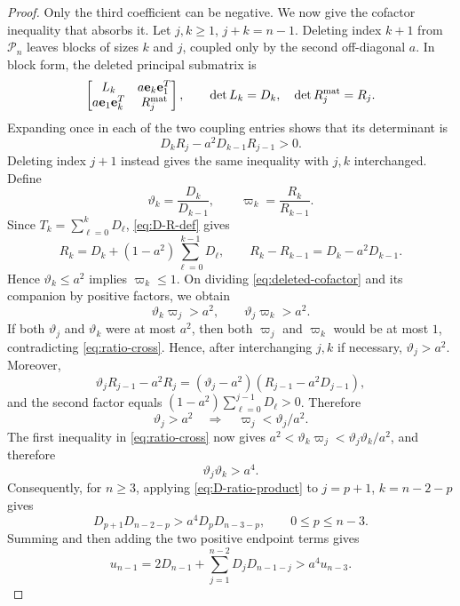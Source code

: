 \documentclass[review,hidelinks,onefignum,onetabnum]{siamart251216}
\begin{document}
\begin{proof}
Only the third coefficient can be negative.  We now give the cofactor
inequality that absorbs it.  Let \(j,k\geq1\), \(j+k=n-1\).  Deleting
index \(k+1\) from \(\mathcal P_n\) leaves blocks of sizes \(k\) and \(j\),
coupled only by the second off-diagonal \(a\).  In block form, the
deleted principal submatrix is
\[
 \begin{bmatrix}
  L_k&a \mathbf e_k\mathbf e_1^T\\
  a \mathbf e_1\mathbf e_k^T&R_j^{\rm mat}
 \end{bmatrix},
 \qquad \det L_k=D_k,\quad \det R_j^{\rm mat}=R_j.
\]
Expanding once in each of the two coupling entries shows that its
determinant is
\begin{equation}\label{eq:deleted-cofactor}
 D_kR_j-a^2D_{k-1}R_{j-1}>0.
\end{equation}
Deleting index \(j+1\) instead gives the same inequality with \(j,k\)
interchanged.  Define
\[
 \vartheta_k=\frac{D_k}{D_{k-1}},\qquad
 \varpi_k=\frac{R_k}{R_{k-1}}.
\]
Since \(T_k=\sum_{\ell=0}^kD_\ell\), \eqref{eq:D-R-def} gives
\begin{equation}\label{eq:R-D-relation}
 R_k=D_k+(1-a^2)\sum_{\ell=0}^{k-1}D_\ell,\qquad
 R_k-R_{k-1}=D_k-a^2D_{k-1}.
\end{equation}
Hence \(\vartheta_k\leq a^2\) implies \(\varpi_k\leq1\).  On dividing
\eqref{eq:deleted-cofactor} and its companion by positive factors, we
obtain
\begin{equation}\label{eq:ratio-cross}
 \vartheta_k\varpi_j>a^2,\qquad \vartheta_j\varpi_k>a^2.
\end{equation}
If both \(\vartheta_j\) and \(\vartheta_k\) were at most \(a^2\), then
both \(\varpi_j\) and \(\varpi_k\) would be at most \(1\),
contradicting \eqref{eq:ratio-cross}.  Hence, after interchanging
\(j,k\) if necessary, \(\vartheta_j>a^2\).  Moreover,
\[
 \vartheta_jR_{j-1}-a^2R_j
 =(\vartheta_j-a^2)(R_{j-1}-a^2D_{j-1}),
\]
and the second factor equals
\((1-a^2)\sum_{\ell=0}^{j-1}D_\ell>0\).  Therefore
\[
 \vartheta_j>a^2\quad\Longrightarrow\quad
 \varpi_j<\vartheta_j/a^2.
\]
The first inequality in \eqref{eq:ratio-cross} now gives
\(a^2<\vartheta_k\varpi_j<\vartheta_j\vartheta_k/a^2\), and therefore
\begin{equation}\label{eq:D-ratio-product}
 \vartheta_j\vartheta_k>a^4.
\end{equation}
Consequently, for \(n\geq3\),
applying \eqref{eq:D-ratio-product} to \(j=p+1\), \(k=n-2-p\) gives
\[
 D_{p+1}D_{n-2-p}>a^4D_pD_{n-3-p},
 \qquad0\leq p\leq n-3.
\]
Summing and then adding the two positive endpoint terms gives
\begin{equation}\label{eq:u-absorption}
 u_{n-1}=2D_{n-1}+\sum_{j=1}^{n-2}D_jD_{n-1-j}>a^4u_{n-3}.
\end{equation}


\end{proof}
\end{document}
